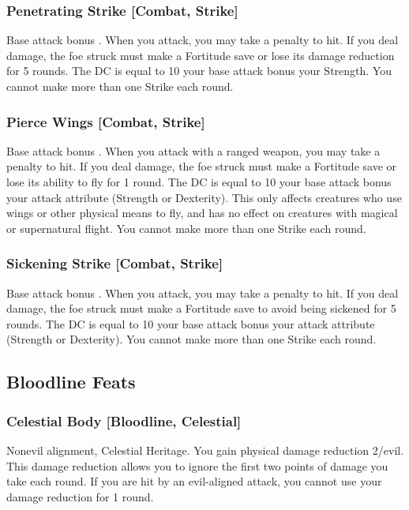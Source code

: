\subsubsection{Penetrating Strike [Combat, Strike]}
\featpre Base attack bonus .
\featben When you attack, you may take a  penalty to hit. If you deal damage, the foe struck must make a Fortitude save or lose its damage reduction for 5 rounds. The DC is equal to 10 \add your base attack bonus \add your Strength. You cannot make more than one Strike each round.

\subsubsection{Pierce Wings [Combat, Strike]}
\featpre Base attack bonus .
\featben When you attack with a ranged weapon, you may take a  penalty to hit. If you deal damage, the foe struck must make a Fortitude save or lose its ability to fly for 1 round. The DC is equal to 10 \add your base attack bonus \add your attack attribute (Strength or Dexterity). This only affects creatures who use wings or other physical means to fly, and has no effect on creatures with magical or supernatural flight. You cannot make more than one Strike each round.

\subsubsection{Sickening Strike [Combat, Strike]}
\featpre Base attack bonus .
\featben When you attack, you may take a  penalty to hit. If you deal damage, the foe struck must make a Fortitude save to avoid being sickened for 5 rounds. The DC is equal to 10 \add your base attack bonus \add your attack attribute (Strength or Dexterity). You cannot make more than one Strike each round.

\subsection{Bloodline Feats}

\subsubsection{Celestial Body [Bloodline, Celestial]}
 Nonevil alignment, Celestial Heritage.
 You gain physical damage reduction 2/evil. This damage reduction allows you to ignore the first two points of damage you take each round. If you are hit by an evil-aligned attack, you cannot use your damage reduction for 1 round.

